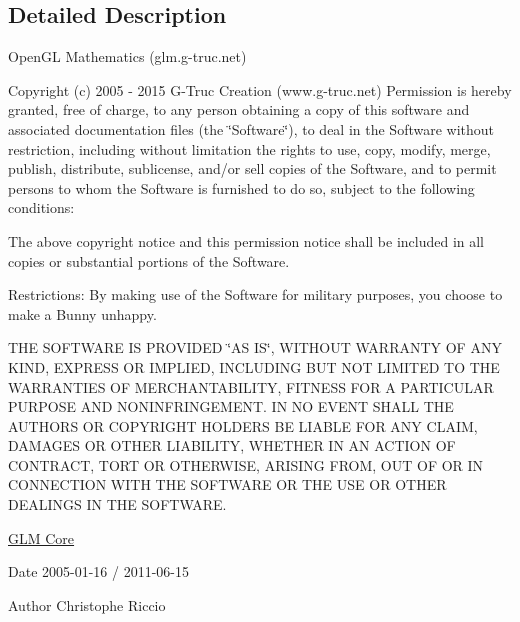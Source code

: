 \subsection{Detailed Description}
Open\-G\-L Mathematics (glm.\-g-\/truc.\-net)

Copyright (c) 2005 -\/ 2015 G-\/\-Truc Creation (www.\-g-\/truc.\-net) Permission is hereby granted, free of charge, to any person obtaining a copy of this software and associated documentation files (the \char`\"{}\-Software\char`\"{}), to deal in the Software without restriction, including without limitation the rights to use, copy, modify, merge, publish, distribute, sublicense, and/or sell copies of the Software, and to permit persons to whom the Software is furnished to do so, subject to the following conditions\-:

The above copyright notice and this permission notice shall be included in all copies or substantial portions of the Software.

Restrictions\-: By making use of the Software for military purposes, you choose to make a Bunny unhappy.

T\-H\-E S\-O\-F\-T\-W\-A\-R\-E I\-S P\-R\-O\-V\-I\-D\-E\-D \char`\"{}\-A\-S I\-S\char`\"{}, W\-I\-T\-H\-O\-U\-T W\-A\-R\-R\-A\-N\-T\-Y O\-F A\-N\-Y K\-I\-N\-D, E\-X\-P\-R\-E\-S\-S O\-R I\-M\-P\-L\-I\-E\-D, I\-N\-C\-L\-U\-D\-I\-N\-G B\-U\-T N\-O\-T L\-I\-M\-I\-T\-E\-D T\-O T\-H\-E W\-A\-R\-R\-A\-N\-T\-I\-E\-S O\-F M\-E\-R\-C\-H\-A\-N\-T\-A\-B\-I\-L\-I\-T\-Y, F\-I\-T\-N\-E\-S\-S F\-O\-R A P\-A\-R\-T\-I\-C\-U\-L\-A\-R P\-U\-R\-P\-O\-S\-E A\-N\-D N\-O\-N\-I\-N\-F\-R\-I\-N\-G\-E\-M\-E\-N\-T. I\-N N\-O E\-V\-E\-N\-T S\-H\-A\-L\-L T\-H\-E A\-U\-T\-H\-O\-R\-S O\-R C\-O\-P\-Y\-R\-I\-G\-H\-T H\-O\-L\-D\-E\-R\-S B\-E L\-I\-A\-B\-L\-E F\-O\-R A\-N\-Y C\-L\-A\-I\-M, D\-A\-M\-A\-G\-E\-S O\-R O\-T\-H\-E\-R L\-I\-A\-B\-I\-L\-I\-T\-Y, W\-H\-E\-T\-H\-E\-R I\-N A\-N A\-C\-T\-I\-O\-N O\-F C\-O\-N\-T\-R\-A\-C\-T, T\-O\-R\-T O\-R O\-T\-H\-E\-R\-W\-I\-S\-E, A\-R\-I\-S\-I\-N\-G F\-R\-O\-M, O\-U\-T O\-F O\-R I\-N C\-O\-N\-N\-E\-C\-T\-I\-O\-N W\-I\-T\-H T\-H\-E S\-O\-F\-T\-W\-A\-R\-E O\-R T\-H\-E U\-S\-E O\-R O\-T\-H\-E\-R D\-E\-A\-L\-I\-N\-G\-S I\-N T\-H\-E S\-O\-F\-T\-W\-A\-R\-E.

\hyperlink{group__core}{G\-L\-M Core}

\begin{DoxyDate}{Date}
2005-\/01-\/16 / 2011-\/06-\/15 
\end{DoxyDate}
\begin{DoxyAuthor}{Author}
Christophe Riccio 
\end{DoxyAuthor}
